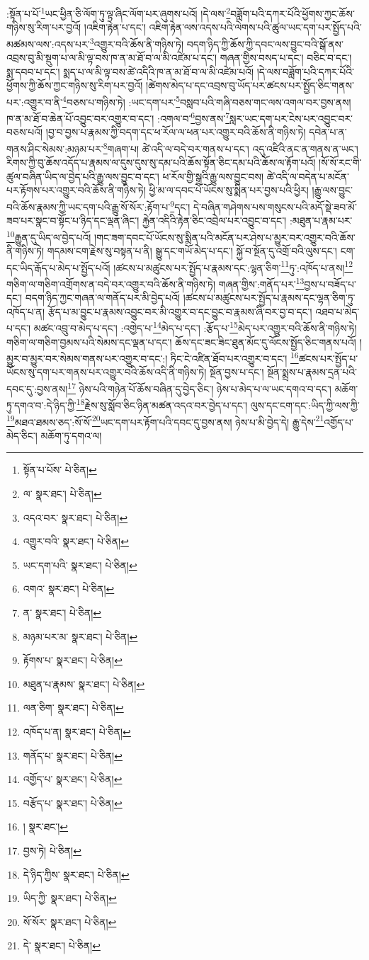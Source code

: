 :སྟོན་པ་པོ་\footnote{སྟོན་པ་པོས་  པེ་ཅིན། }ཡང་ཕྱིན་ཅི་ལོག་ཏུ་ལྟ་ཞིང་ལོག་པར་ཞུགས་པའོ། །དེ་ལས་\footnote{ལ་  སྣར་ཐང་།  པེ་ཅིན། }བཟློག་པའི་དཀར་པོའི་ཕྱོགས་ཀྱང་ཆོས་གཉིས་སུ་རིག་པར་བྱའོ། །འཇིག་རྟེན་པ་དང་། འཇིག་རྟེན་ལས་འདས་པའི་ལེགས་པའི་ཚུལ་ཡང་དག་པར་སྤྱོད་པའི་མཚམས་ལས་:འདས་པར་\footnote{འདའ་བར་  སྣར་ཐང་།  པེ་ཅིན། }འགྱུར་བའི་ཆོས་ནི་གཉིས་ཏེ། བདག་ཉིད་ཀྱི་ཆོས་ཀྱི་དབང་ལས་བྱུང་བའི་སྒོ་ནས་འབྲས་བུ་མི་སྡུག་པ་ལ་མི་ལྟ་བས་ཁ་ན་མ་ཐོ་བ་ལ་མི་འཛེམ་པ་དང་། གཞན་གྱིས་བསད་པ་དང་། བཅིང་བ་དང་། སྨ་དབབ་པ་དང་། སྨད་པ་ལ་མི་ལྟ་བས་ཚེ་འདིའི་ཁ་ན་མ་ཐོ་བ་ལ་མི་འཛེམ་པའོ། །དེ་ལས་བཟློག་པའི་དཀར་པོའི་ཕྱོགས་ཀྱི་ཆོས་ཀྱང་གཉིས་སུ་རིག་པར་བྱའོ། །ཚེགས་མེད་པ་དང་འབྲས་བུ་ཡོད་པར་ཚངས་པར་སྤྱོད་ཅིང་གནས་པར་:འགྱུར་བ་ནི་\footnote{འགྱུར་བའི་  སྣར་ཐང་།  པེ་ཅིན། }བཅས་པ་གཉིས་ཏེ། :ཡང་དག་པར་\footnote{ཡང་དག་པའི་  སྣར་ཐང་།  པེ་ཅིན། }བསླབ་པའི་གཞི་བཅས་གང་ལས་འགལ་བར་བྱས་ནས། ཁ་ན་མ་ཐོ་བ་ཆེན་པོ་འབྱུང་བར་འགྱུར་བ་དང་། :འགལ་བ་\footnote{འགའ་  སྣར་ཐང་།  པེ་ཅིན། }བྱས་ནས་\footnote{ན་  སྣར་ཐང་།  པེ་ཅིན། }སླར་ཡང་དག་པར་ངེས་པར་འབྱུང་བར་བཅས་པའོ། །བྱ་བ་བྱས་པ་རྣམས་ཀྱི་བདག་དང་ཕ་རོལ་ལ་ཕན་པར་འགྱུར་བའི་ཆོས་ནི་གཉིས་ཏེ། དབེན་པ་ན་གནས་ཤིང་སེམས་:མཉམ་པར་\footnote{མཉམ་པར་མ་  སྣར་ཐང་།  པེ་ཅིན། }གཞག་པ། ཚེ་འདི་ལ་བདེ་བར་གནས་པ་དང་། འདུ་འཛིའི་ནང་ན་གནས་ན་ཡང་། རིགས་ཀྱི་བུ་ཆོས་འདོད་པ་རྣམས་ལ་དུས་དུས་སུ་དམ་པའི་ཆོས་སྟོན་ཅིང་དམ་པའི་ཆོས་ལ་རྟོག་པའོ། །སོ་སོ་རང་གི་ཚུལ་བཞིན་ཡིད་ལ་བྱེད་པའི་རྒྱུ་ལས་བྱུང་བ་དང་། ཕ་རོལ་གྱི་སྒྲའི་རྒྱུ་ལས་བྱུང་བས། ཚེ་འདི་ལ་བདེན་པ་མངོན་པར་རྟོགས་པར་འགྱུར་བའི་ཆོས་ནི་གཉིས་ཏེ། ཕྱི་མ་ལ་དབང་པོ་ཡོངས་སུ་སྨིན་པར་བྱས་པའི་ཕྱིར། །རྒྱུ་ལས་བྱུང་བའི་ཆོས་རྣམས་ཀྱི་ཡང་དག་པའི་རྒྱུ་སོ་སོར་:རྟོག་པ་\footnote{རྟོགས་པ་  སྣར་ཐང་།  པེ་ཅིན། }དང་། དེ་བཞིན་གཤེགས་པས་གསུངས་པའི་མདོ་སྡེ་ཟབ་མོ་ཟབ་པར་སྣང་བ་སྟོང་པ་ཉིད་དང་ལྡན་ཞིང་། རྐྱེན་འདིའི་རྟེན་ཅིང་འབྲེལ་པར་འབྱུང་བ་དང་། :མཐུན་པ་རྣམ་པར་\footnote{མཐུན་པ་རྣམས་  སྣར་ཐང་།  པེ་ཅིན། }རྒྱུན་དུ་ཡིད་ལ་བྱེད་པའོ། །གང་ཟག་དབང་པོ་ཡོངས་སུ་སྨིན་པའི་མངོན་པར་ཤེས་པ་མྱུར་བར་འགྱུར་བའི་ཆོས་ནི་གཉིས་ཏེ། གདམས་ངག་རྗེས་སུ་བསྟན་པ་ནི། སྒྱུ་དང་གཡོ་མེད་པ་དང་། སྐྱོ་བ་སྔོན་དུ་འགྲོ་བའི་ལུས་དང་། ངག་དང་ཡིད་རྒོད་པ་མེད་པ་སྤྱོད་པའོ། །ཚངས་པ་མཚུངས་པར་སྤྱོད་པ་རྣམས་དང་:ལྷན་ཅིག་\footnote{ལན་ཅིག་  སྣར་ཐང་།  པེ་ཅིན། }ཏུ་:འཁོད་པ་ནས།\footnote{འཁོད་པ་ན།  སྣར་ཐང་།  པེ་ཅིན། } གཅིག་ལ་གཅིག་འགྲོགས་ན་བདེ་བར་འགྱུར་བའི་ཆོས་ནི་གཉིས་ཏེ། གཞན་གྱིས་:གནོད་པར་\footnote{གནོད་པ་  སྣར་ཐང་།  པེ་ཅིན། }བྱས་པ་བཟོད་པ་དང་། བདག་ཉིད་ཀྱང་གཞན་ལ་གནོད་པར་མི་བྱེད་པའོ། །ཚངས་པ་མཚུངས་པར་སྤྱོད་པ་རྣམས་དང་ལྷན་ཅིག་ཏུ་འཁོད་པ་ན། རྩོད་པ་མ་བྱུང་པ་རྣམས་འབྱུང་བར་མི་འགྱུར་བ་དང་བྱུང་བ་རྣམས་ཞི་བར་བྱ་བ་དང་། འཐབ་པ་མེད་པ་དང་། མཚང་འབྲུ་བ་མེད་པ་དང་། :འགྱེད་པ་\footnote{འགྱོད་པ་  སྣར་ཐང་།  པེ་ཅིན། }མེད་པ་དང་། :རྩོད་པ་\footnote{བརྩོད་པ་  སྣར་ཐང་།  པེ་ཅིན། }མེད་པར་འགྱུར་བའི་ཆོས་ནི་གཉིས་ཏེ། གཅིག་ལ་གཅིག་བྱམས་པའི་སེམས་དང་ལྡན་པ་དང་། ཆོས་དང་ཟང་ཟིང་ཐུན་མོང་དུ་ལོངས་སྤྱོད་ཅིང་གནས་པའོ། །མྱུར་བ་མྱུར་བར་སེམས་གནས་པར་འགྱུར་བ་དང་:། ཏིང་ངེ་འཛིན་ཐོབ་པར་འགྱུར་བ་དང་། \footnote{།    སྣར་ཐང་། }ཚངས་པར་སྤྱོད་པ་ཡོངས་སུ་དག་པར་གནས་པར་འགྱུར་བའི་ཆོས་འདི་ནི་གཉིས་ཏེ། སྔོན་བྱས་པ་དང་། སྔོན་སྨྲས་པ་རྣམས་དྲན་པའི་དབང་དུ་:བྱས་ནས།\footnote{བྱས་ཏེ།  པེ་ཅིན། } ཉེས་པའི་གཉེན་པོ་ཆོས་བཞིན་དུ་བྱེད་ཅིང་། ཉེས་པ་མེད་པ་ལ་ཡང་དགའ་བ་དང་། མཆོག་ཏུ་དགའ་བ་:དེ་ཉིད་ཀྱི་\footnote{དེ་ཉིད་ཀྱིས་  སྣར་ཐང་།  པེ་ཅིན། }རྗེས་སུ་སློབ་ཅིང་ཉིན་མཚན་འདའ་བར་བྱེད་པ་དང་། ལུས་དང་ངག་དང་:ཡིད་ཀྱི་ལས་ཀྱི་\footnote{ཡིད་ཀྱི་  སྣར་ཐང་།  པེ་ཅིན། }མཐའ་ཐམས་ཅད་:སོ་སོ་\footnote{སོ་སོར་  སྣར་ཐང་།  པེ་ཅིན། }ཡང་དག་པར་རྟོག་པའི་དབང་དུ་བྱས་ནས། ཉེས་པ་མི་བྱེད་དེ། རྒྱུ་དེས་\footnote{དེ་  སྣར་ཐང་།  པེ་ཅིན། }འགྱོད་པ་མེད་ཅིང་། མཆོག་ཏུ་དགའ་ལ། 
